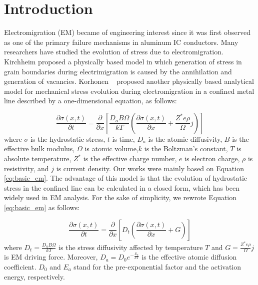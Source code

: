 \section{Introduction}
\label{sec:intro}

Electromigration (EM) became of engineering interest since it was first observed as one of the primary failure mechanisms in aluminum IC conductors. Many researchers have studied the evolution of stress due to electromigration. Kirchheim proposed a physically based model in which generation of stress in grain boundaries during electrimigration is caused by the annihilation and generation of vacancies. Korhonen ~\cite{Korhonen:jap1993} proposed another physically based analytical model for mechanical stress evolution during electromigration in a confined metal line described by a one-dimensional equation, as follows:

\begin{equation}
\label{eq:basic_em}
\frac{\partial \sigma(x,t)}{\partial t}=\frac{\partial }{\partial x}\left[\frac{D_aB\Omega}{kT}\left(\frac{\partial \sigma(x,t)}{\partial x}+\frac{Z^*e\rho}{\Omega}j\right)\right]
\end{equation}
where $\sigma$ is the hydrostatic stress, $t$ is time, $D_a$ is the atomic diffusivity, $B$ is the effective bulk modulus, $\Omega$ is atomic volume,$k$ is the Boltzman's constant, $T$ is absolute temperature, $Z^*$ is the effective charge number, $e$ is electron charge, $\rho$ is resistivity, and $j$ is current density. Our works were mainly based on Equation
\eqref{eq:basic_em}. The advantage of this model is that the evolution of hydrostatic stress in the confined line can be calculated in a closed form, which has been widely used in EM analysis. For the sake of simplicity, we rewrote Equation \eqref{eq:basic_em} as follows:

\begin{equation}
\label{eq:basic_em_s}
\frac{\partial \sigma(x,t)}{\partial t}=\frac{\partial }{\partial x}\left[D_t\left(\frac{\partial \sigma(x,t)}{\partial x}+G\right)\right]
\end{equation}
where $D_t=\frac{D_aB\Omega}{kT}$ is the stress diffusivity affected by temperature $T$ and $G=\frac{Z^*e\rho}{\Omega}j$ is EM driving force. Moreover, $D_a=D_0e^{-\frac{E_a}{kT}}$ is the effective atomic diffusion coefficient. $D_0$ and $E_a$ stand for the pre-exponential factor and the activation energy, respectively.

